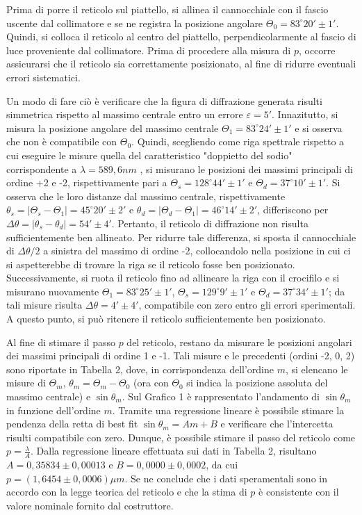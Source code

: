 \documentclass{article}
\begin{document}
Prima di porre il reticolo sul piattello, si allinea il cannocchiale con il fascio uscente dal collimatore e se ne registra la posizione angolare $\Theta_0=83^{\circ}20'\pm1'$. Quindi, si colloca il reticolo al centro del piattello, perpendicolarmente al fascio di luce proveniente
dal collimatore. Prima di procedere alla misura di $p$, occorre assicurarsi che il reticolo sia correttamente posizionato, al fine di ridurre eventuali errori sistematici.
 
Un modo di fare ciò è verificare che la figura di diffrazione generata risulti simmetrica rispetto al massimo centrale entro un errore $\varepsilon = 5'$. Innazitutto, si misura la posizione angolare del massimo centrale $\Theta_1 = 83^\circ 24' \pm 1'$ e si osserva che non è compatibile con $\Theta_0$.
Quindi, scegliendo come riga spettrale rispetto a cui eseguire le misure quella del caratteristico "doppietto del sodio" corrispondente a $\lambda=589,6nm$ , si misurano le posizioni dei massimi principali di ordine +2  e -2, rispettivamente pari a $\Theta_s = 128^\circ 44' \pm 1'$
e $\Theta_d = 37^\circ 10' \pm 1'$. Si osserva che le loro distanze dal massimo centrale, rispettivamente $\theta_s = |\Theta_s - \Theta_1| = 45^\circ20' \pm 2'$ e $\theta_d = |\Theta_d - \Theta_1| = 46^\circ 14' \pm 2'$, differiscono per
$\Delta\theta = |\theta_s - \theta_d| = 54' \pm 4'$. Pertanto, il reticolo di diffrazione non risulta sufficientemente ben allineato. Per ridurre tale differenza, si sposta il cannocchiale di $\Delta\theta/2$ a sinistra del massimo di ordine -2, collocandolo nella posizione in cui ci si
aspetterebbe di trovare la riga se il reticolo fosse ben posizionato. Successivamente, si ruota il reticolo fino ad allineare la riga con il crocifilo e si misurano nuovamente $\Theta_1 = 83^\circ 25' \pm 1'$, $\Theta_s = 129^\circ 9' \pm 1'$ e $\Theta_d = 37^\circ 34' \pm 1'$; da tali misure risulta $\Delta\theta
= 4' \pm 4'$, compatibile con zero entro gli errori sperimentali. A questo punto, si può ritenere il reticolo sufficientemente ben posizionato.

Al fine di stimare il passo $p$ del reticolo, restano da misurare le posizioni angolari dei massimi principali di ordine 1 e -1.
Tali misure e le precedenti (ordini -2, 0, 2) sono riportate in Tabella 2, dove, in corrispondenza dell'ordine $m$, si elencano le misure di $\Theta_m$, $\theta_m = \Theta_m - \Theta_0$ (ora con $\Theta_0$ si indica la posizione assoluta del massimo centrale) e $\sin \theta_m$.
Sul Grafico 1 è rappresentato l'andamento di $\sin \theta_m$ in funzione dell'ordine $m$. Tramite una regressione lineare è possibile stimare la pendenza della retta di best fit $\sin \theta_m = Am + B$ e verificare che l'intercetta risulti compatibile con zero. Dunque, è possibile stimare il passo del reticolo come $p=\frac{\lambda}{A}$.
Dalla regressione lineare effettuata sui dati in Tabella 2, risultano $A=0,35834\pm0,00013$ e $B=0,0000\pm0,0002$, da cui $p=(1,6454\pm0,0006)\mu m$. Se ne conclude che i dati speramentali sono in accordo con la legge teorica del reticolo e che la stima di $p$ è consistente con il valore nominale fornito dal costruttore.
\end{document}
